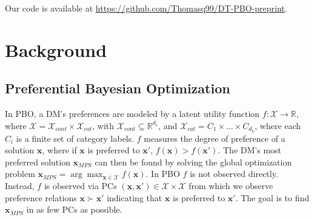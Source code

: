 \documentclass{article}
\begin{document}



Our code is available at \url{https://github.com/Thomasq99/DT-PBO-preprint}.

\section{Background}\label{sec:background}
\subsection{Preferential Bayesian Optimization}

In PBO, a DM's preferences are modeled by a latent utility function $f:\mathcal{X} \rightarrow \mathbb{R}$, where  $\mathcal{X} = \mathcal{X}_{cont} \times \mathcal{X}_{cat}$, with $\mathcal{X}_{cont} \subseteq \mathbb{R}^{d_c}$, and $\mathcal{X}_{cat} = C_1 \times \ldots \times C_{d_k}$, where each $C_i$ is a finite set of category labels. $f$ measures the degree of preference of a solution $\mathbf{x}$, where if $\mathbf{x}$ is preferred to $\mathbf{x}'$,  $f(\mathbf{x}) > f(\mathbf{x'})$. The DM's most preferred solution $\mathbf{x}_{MPS}$ can then be found by solving the global optimization problem $\mathbf{x}_{MPS} = \arg \max_{\mathbf{x} \in \mathcal{X}}f(\mathbf{x}).
$ In PBO $f$ is not observed directly. Instead, $f$ is observed via PCs $(\mathbf{x}, \mathbf{x}') \in \mathcal{X} \times\mathcal{X}$ from which we observe preference relations $\mathbf{x} \succ \mathbf{x'}$ indicating that $\mathbf{x}$ is preferred to $\mathbf{x}'$. The goal is to find $\mathbf{x}_{MPS}$ in as few PCs as possible.
\end{document}
